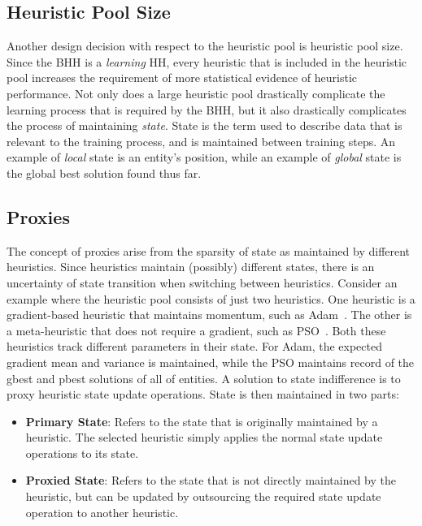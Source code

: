 \subsection{Heuristic Pool Size}\label{sec:bhh:heuristic_pool:pool_size}

Another design decision with respect to the heuristic pool is heuristic pool size. Since the \acs{BHH} is a \textit{learning} \acs{HH}, every heuristic that is included in the heuristic pool increases the requirement of more statistical evidence of heuristic performance. Not only does a large heuristic pool drastically complicate the learning process that is required by the \acs{BHH}, but it also drastically complicates the process of maintaining \textit{state}. State is the term used to describe data that is relevant to the training process, and is maintained between training steps. An example of \textit{local} state is an entity's position, while an example of \textit{global} state is the global best solution found thus far.

\subsection{Proxies}\label{sec:bhh:heuristic:proxies}

The concept of proxies arise from the sparsity of state as maintained by different heuristics. Since heuristics maintain (possibly) different states, there is an uncertainty of state transition when switching between heuristics. Consider an example where the heuristic pool consists of just two heuristics. One heuristic is a gradient-based heuristic that maintains momentum, such as \acs{Adam}~\cite{ref:kingma:2014}. The other is a meta-heuristic that does not require a gradient, such as \acs{PSO}~\cite{ref:shi:1998}. Both these heuristics track different parameters in their state. For \acs{Adam}, the expected gradient mean and variance is maintained, while the \ac{PSO} maintains record of the gbest and pbest solutions of all of entities. A solution to state indifference is to proxy heuristic state update operations. State is then maintained in two parts:

\begin{itemize}
      \item \textbf{Primary State}: Refers to the state that is originally maintained by a heuristic. The selected heuristic simply applies the normal state update operations to its state.

      \item \textbf{Proxied State}: Refers to the state that is not directly maintained by the heuristic, but can be updated by outsourcing the required state update operation to another heuristic.
\end{itemize}

